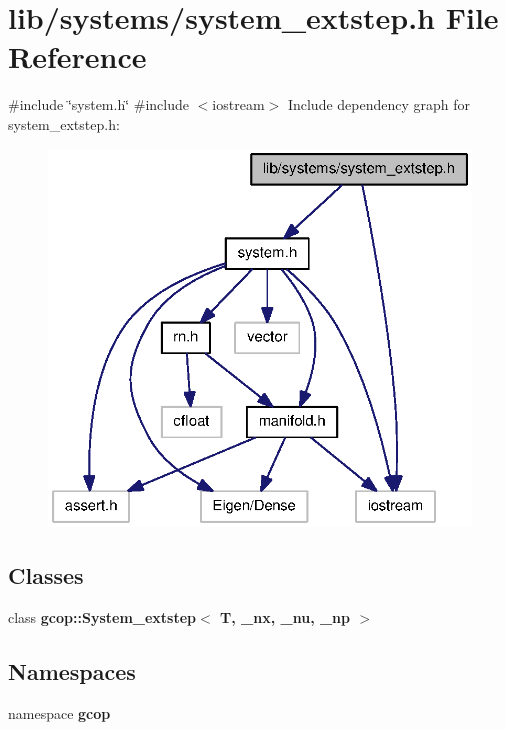 \section{lib/systems/system\-\_\-extstep.h \-File \-Reference}
\label{system__extstep_8h}
{\ttfamily \#include \char`\"{}system.\-h\char`\"{}}\*
{\ttfamily \#include $<$iostream$>$}\*
\-Include dependency graph for system\-\_\-extstep.\-h\-:\nopagebreak
\begin{figure}[H]
\begin{center}
\leavevmode
\includegraphics[width=328pt]{system__extstep_8h__incl}
\end{center}
\end{figure}
\subsection*{\-Classes}
\begin{DoxyCompactItemize}
\item 
class {\bf gcop\-::\-System\-\_\-extstep$<$ T, \-\_\-nx, \-\_\-nu, \-\_\-np $>$}
\end{DoxyCompactItemize}
\subsection*{\-Namespaces}
\begin{DoxyCompactItemize}
\item 
namespace {\bf gcop}
\end{DoxyCompactItemize}
